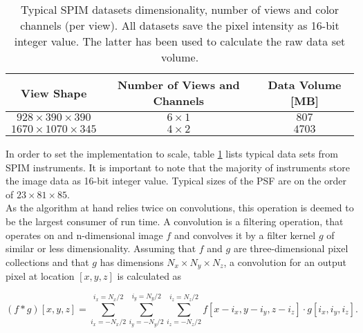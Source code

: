 \begin{table}
  \begin{tabular}{ccc}                                                                                                                                                                              
    \hline                                                                                                                                                                                         
    View Shape  & Number of Views and Channels & Data Volume [MB]   \\
    \hline                                                       
    $928\times390\times390$ & $6 \times 1$ & $807$ \\
    $1670\times1070\times345$ & $4 \times 2$ & $4703$ \\
    \hline                                                                                                                                                                                         
  \end{tabular} 
  \label{typ_datasets}
  \caption{Typical SPIM datasets dimensionality, number of views and color channels (per view). All datasets save the pixel intensity as 16-bit integer value. The latter has been used to calculate the raw data set volume.}
\end{table} 

In order to set the implementation to scale, table \ref{typ_datasets} lists typical data sets from SPIM instruments. It is important to note that the majority of instruments store the image data as 16-bit integer value. Typical sizes of the PSF are on the order of $23 \times 81 \times 85$. \\

As the algorithm at hand relies twice on convolutions, this operation is deemed to be the largest consumer of run time. A convolution is a filtering operation, that operates on and n-dimensional image $f$ and convolves it by a filter kernel $g$ of similar or less dimensionality. Assuming that $f$ and $g$ are three-dimensional pixel collections and that $g$ has dimensions $N_{x} \times N_{y} \times N_{z}$, a convolution for an output pixel at location $[x,y,z]$ is calculated as 

\begin{equation}
  \label{eq:disc_convolve}
  (f \ast g)[x,y,z] = \sum^{i_x = N_{x}/2}_{i_x = -N_{x}/2} \sum^{i_y = N_{y}/2}_{i_y = -N_{y}/2} \sum^{i_z = N_{z}/2}_{i_z = -N_{z}/2} f[x-i_x,y-i_y,z-i_z] \cdot g[i_x,i_y,i_z].
\end{equation}

